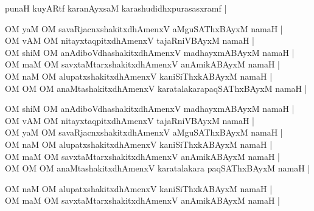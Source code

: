 \begin{entry}
\smallskip
\begin{shl}
punaH kuyARtf karanAyxsaM karashudidhxpurasasxramf |
\end{shl}
\medskip
{}
\smallskip
{}
\smallskip
\begin{shl}
OM yaM OM savaRjacnxshakitxdhAmenxV aMguSAThxBAyxM namaH |\\[2pt]
OM vAM OM nitayxtaqpitxdhAmenxV tajaRniVBAyxM namaH |\\[2pt]
OM shiM OM anAdiboVdhashakitxdhAmenxV madhayxmABAyxM namaH |\\[2pt]
OM maM OM savxtaMtarxshakitxdhAmenxV anAmikABAyxM namaH |\\[2pt]
OM naM OM alupatxshakitxdhAmenxV kaniSiThxkABAyxM namaH |\\[2pt]
OM OM OM anaMtashakitxdhAmenxV karatalakarapaqSAThxBAyxM namaH |
\end{shl}
\smallskip
{}
\smallskip
\begin{shl}
OM shiM OM anAdiboVdhashakitxdhAmenxV madhayxmABAyxM namaH |\\[2pt]
OM vAM OM nitayxtaqpitxdhAmenxV tajaRniVBAyxM namaH |\\[2pt]
OM yaM OM savaRjacnxshakitxdhAmenxV aMguSAThxBAyxM namaH |\\[2pt]
OM naM OM alupatxshakitxdhAmenxV kaniSiThxkABAyxM namaH |\\[2pt]
OM maM OM savxtaMtarxshakitxdhAmenxV anAmikABAyxM namaH |\\[2pt]
OM OM OM anaMtashakitxdhAmenxV karatalakara paqSAThxBAyxM namaH |
\end{shl}
\smallskip
{}
\smallskip
\begin{shl}
OM naM OM alupatxshakitxdhAmenxV kaniSiThxkABAyxM namaH |\\[2pt]
OM maM OM savxtaMtarxshakitxdhAmenxV anAmikABAyxM namaH |\\[2pt]

\end{shl}
\end{entry}
